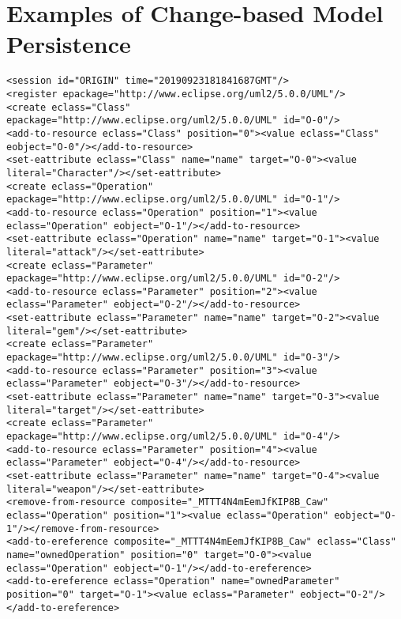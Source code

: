 \chapter{Examples of Change-based Model Persistence}
\label{sec:examples_of_cbp}

\vspace{-20pt}
\begin{lstlisting}[style=cbpfile,caption={Change-based representation of the model in Figure \ref{fig:class_diagram_left}.},label=lst:class_diagram_left_cbpfile]
<session id="ORIGIN" time="20190923181841687GMT"/>
<register epackage="http://www.eclipse.org/uml2/5.0.0/UML"/>
<create eclass="Class" epackage="http://www.eclipse.org/uml2/5.0.0/UML" id="O-0"/>
<add-to-resource eclass="Class" position="0"><value eclass="Class" eobject="O-0"/></add-to-resource>
<set-eattribute eclass="Class" name="name" target="O-0"><value literal="Character"/></set-eattribute>
<create eclass="Operation" epackage="http://www.eclipse.org/uml2/5.0.0/UML" id="O-1"/>
<add-to-resource eclass="Operation" position="1"><value eclass="Operation" eobject="O-1"/></add-to-resource>
<set-eattribute eclass="Operation" name="name" target="O-1"><value literal="attack"/></set-eattribute>
<create eclass="Parameter" epackage="http://www.eclipse.org/uml2/5.0.0/UML" id="O-2"/>
<add-to-resource eclass="Parameter" position="2"><value eclass="Parameter" eobject="O-2"/></add-to-resource>
<set-eattribute eclass="Parameter" name="name" target="O-2"><value literal="gem"/></set-eattribute>
<create eclass="Parameter" epackage="http://www.eclipse.org/uml2/5.0.0/UML" id="O-3"/>
<add-to-resource eclass="Parameter" position="3"><value eclass="Parameter" eobject="O-3"/></add-to-resource>
<set-eattribute eclass="Parameter" name="name" target="O-3"><value literal="target"/></set-eattribute>
<create eclass="Parameter" epackage="http://www.eclipse.org/uml2/5.0.0/UML" id="O-4"/>
<add-to-resource eclass="Parameter" position="4"><value eclass="Parameter" eobject="O-4"/></add-to-resource>
<set-eattribute eclass="Parameter" name="name" target="O-4"><value literal="weapon"/></set-eattribute>
<remove-from-resource composite="_MTTT4N4mEemJfKIP8B_Caw" eclass="Operation" position="1"><value eclass="Operation" eobject="O-1"/></remove-from-resource>
<add-to-ereference composite="_MTTT4N4mEemJfKIP8B_Caw" eclass="Class" name="ownedOperation" position="0" target="O-0"><value eclass="Operation" eobject="O-1"/></add-to-ereference>
<add-to-ereference eclass="Operation" name="ownedParameter" position="0" target="O-1"><value eclass="Parameter" eobject="O-2"/></add-to-ereference>

\end{lstlisting}
